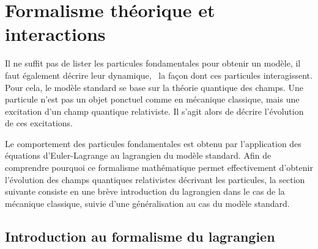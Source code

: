 \section{Formalisme théorique et interactions}\label{chapter-MS-MSSM-section-formalisme}
Il ne suffit pas de lister les particules fondamentales pour obtenir un modèle, il faut également décrire leur dynamique, \ie\ la façon dont ces particules interagissent. 
Pour cela, le modèle standard se base sur la théorie quantique des champs. Une particule n'est pas un \og objet ponctuel \fg{} comme en mécanique classique, mais une excitation d'un champ quantique relativiste. Il s'agit alors de décrire l'évolution de ces excitations.
\par
Le comportement des particules fondamentales est obtenu par l'application des équations d'Euler-Lagrange au lagrangien du modèle standard.
Afin de comprendre pourquoi ce formalisme mathématique permet effectivement d'obtenir l'évolution des champs quantiques relativistes décrivant les particules, la section suivante consiste en une brève introduction du lagrangien dans le cas de la mécanique classique, suivie d'une généralisation au cas du modèle standard.
\subsection{Introduction au formalisme du lagrangien}\label{chapter-MS-MSSM-section-formalisme-subsec-into_lagrangien}
